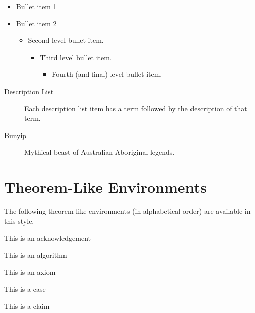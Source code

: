 \begin{itemize}
\item Bullet item 1

\item Bullet item 2

\begin{itemize}
\item Second level bullet item.

\begin{itemize}
\item Third level bullet item.

\begin{itemize}
\item Fourth (and final) level bullet item.
\end{itemize}
\end{itemize}
\end{itemize}
\end{itemize}

\begin{description}
\item[Description List] Each description list item has a term followed by the
description of that term.

\item[Bunyip] Mythical beast of Australian Aboriginal legends.
\end{description}

\section{Theorem-Like Environments}

The following theorem-like environments (in alphabetical order) are available
in this style.

\begin{acknowledgement}
This is an acknowledgement
\end{acknowledgement}

\begin{algorithm}
This is an algorithm
\end{algorithm}

\begin{axiom}
This is an axiom
\end{axiom}

\begin{case}
This is a case
\end{case}

\begin{claim}
This is a claim
\end{claim}

